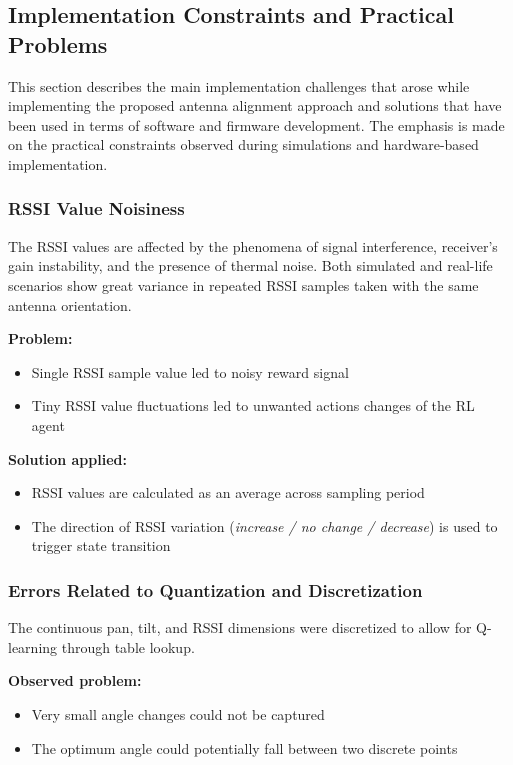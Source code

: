 \subsection{Implementation Constraints and Practical Problems}

This section describes the main implementation challenges that arose while implementing the proposed antenna alignment approach and solutions that have been used in terms of software and firmware development. The emphasis is made on the practical constraints observed during simulations and hardware-based implementation.

\subsubsection{RSSI Value Noisiness}

The RSSI values are affected by the phenomena of signal interference, receiver's gain instability, and the presence of thermal noise. Both simulated and real-life scenarios show great variance in repeated RSSI samples taken with the same antenna orientation.

\textbf{Problem:}
\begin{itemize}
    \item Single RSSI sample value led to noisy reward signal
    \item Tiny RSSI value fluctuations led to unwanted actions changes of the RL agent
\end{itemize}

\textbf{Solution applied:}
\begin{itemize}
    \item RSSI values are calculated as an average across sampling period
    \item The direction of RSSI variation (\emph{increase / no change / decrease}) is used to trigger state transition
\end{itemize}

\subsubsection{Errors Related to Quantization and Discretization}

The continuous pan, tilt, and RSSI dimensions were discretized to allow for Q-learning through table lookup.

\textbf{Observed problem:}
\begin{itemize}
\item Very small angle changes could not be captured
\item The optimum angle could potentially fall between two discrete points
\end{itemize}

